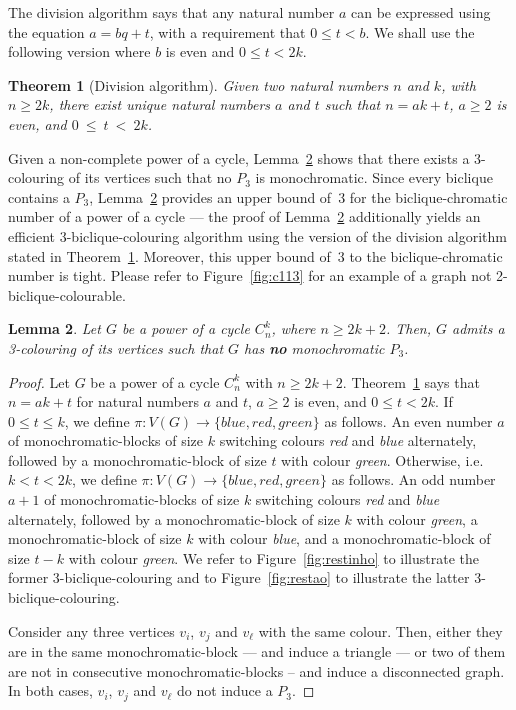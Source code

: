 \documentclass{article}
\newtheorem{theorem}{Theorem}
\newtheorem{lemma}[theorem]{Lemma}
\begin{document}
The division algorithm says that any
natural number $a$ can be expressed using the equation $a = bq + t$, with a
requirement that $0 \leq t < b$. We shall use the following version where $b$ is
even and $0 \leq t < 2k$.


\begin{theorem}[Division algorithm]
\label{thm:division}
Given two natural numbers $n$ and $k$,
with $n \geq 2k$, there exist unique natural numbers $a$ and $t$ such that
$n = ak + t$, $a \geq 2$ is even, and $0~\leq~t~<~2k$.
\end{theorem}


Given a non-complete power of a cycle, Lemma~\ref{lem:3colouringnomonoP3} shows
that there exists a 3-colouring of its vertices such that no $P_3$ is
monochromatic. Since every biclique contains a $P_3$, 
Lemma~\ref{lem:3colouringnomonoP3} provides an upper bound of~3 for the 
biclique-chromatic number of a power of a cycle --- the proof of 
Lemma~\ref{lem:3colouringnomonoP3} additionally yields an efficient 
3-biclique-colouring algorithm using the version of the division 
algorithm stated in Theorem~\ref{thm:division}. 
Moreover, this upper bound of~3 to the biclique-chromatic number 
is tight. Please refer to Figure~\ref{fig:c113} for an example of a graph 
not 2-biclique-colourable.

\begin{lemma}
\label{lem:3colouringnomonoP3}
Let $G$ be a power of a cycle $C_n^k$, where $n \geq 2k + 2$. Then, $G$ admits a
3-colouring of its vertices such that $G$ has \textbf{no} monochromatic $P_3$.
\end{lemma}
\begin{proof}
Let $G$ be a power of a cycle $C_{n}^{k}$ with $n \geq 2k + 2$. 
Theorem~\ref{thm:division} says that $n = ak + t$
for natural numbers $a$ and $t$, $a \geq 2$ is even, and $0 \leq t < 2k$. If $0
\leq t \leq k$, we define $\pi:V(G)\rightarrow\{blue,red,green\}$ as follows. An even number
$a$ of monochromatic-blocks of size $k$ switching colours \emph{red} and
\emph{blue} alternately, followed by a monochromatic-block of size $t$ with
colour \emph{green}. Otherwise, i.e. $k < t < 2k$, we define
$\pi:V(G)\rightarrow\{blue,red,green\}$ as follows. An odd number $a+1$ of
monochromatic-blocks of size $k$ switching colours \emph{red} and \emph{blue}
alternately, followed by a monochromatic-block of size $k$ with colour
\emph{green}, a monochromatic-block of size $k$ with colour \emph{blue}, and a
monochromatic-block of size $t - k$ with colour \emph{green}.  We refer to
Figure~\ref{fig:restinho} to illustrate the former 3-biclique-colouring and to
Figure~\ref{fig:restao} to illustrate the latter 3-biclique-colouring.

Consider any three vertices $v_i$, $v_j$ and $v_\ell$ with the
same colour. Then, either they are in the same monochromatic-block --- and
induce a triangle --- or two of them are not in consecutive
monochromatic-blocks -- and induce a disconnected graph. In both cases, $v_i$,
$v_j$ and $v_\ell$ do not induce a $P_3$. 
\end{proof}
\end{document}
